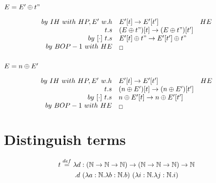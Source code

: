 \documentclass{article}
\newcommand{\bop}[0]{\ensuremath\oplus}
\newcommand{\N}{\ensuremath \mathbb N}
\newcommand{\lam}[2]{\ensuremath{\lambda#1.#2}}
\begin{document}
\subsubsection{$E = E'\bop t"$}
\begin{align*}
    \begin{array}{rlr}
        by\ IH\ with\ HP,E'\ w.h & E'[t]\to E'[t'] & HE \\
        t.s & (E\bop t")[t] \to (E\bop t")[t'] \\
        by\ [\cdot]\ t.s & E'[t] \bop t" \to E'[t']\bop t" \\
        by\ BOP-1\ with\ HE & _\square
    \end{array}
\end{align*}

\subsubsection{$E = n\bop E'$}
\begin{align*}
    \begin{array}{rlr}
        by\ IH\ with\ HP,E'\ w.h & E'[t]\to E'[t'] & HE \\
        t.s & (n\bop E')[t] \to (n\bop E')[t'] \\
        by\ [\cdot]\ t.s & n\bop E'[t] \to n\bop E'[t'] \\
        by\ BOP-1\ with\ HE & _\square
    \end{array}
\end{align*}

\section{Distinguish terms}
\begin{multline*}
    t\overset{def}=\lam{d:(\N\to\N\to\N)\to(\N\to\N\to\N)\to\N\\}{d\ (\lam{a:\N}{\lam{b:\N}{b}})\ (\lam{i:\N}{\lam{j:\N}{i}})}
\end{multline*}
\end{document}
